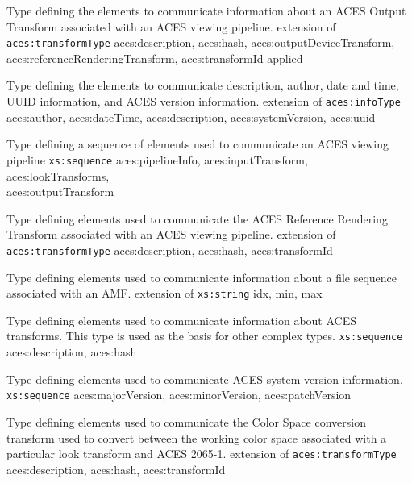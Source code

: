                 {Type defining the elements to communicate information about an ACES Output Transform associated with an ACES viewing pipeline.}
                {extension of \texttt{aces:transformType}}
                {aces:description, aces:hash, aces:outputDeviceTransform,\\ aces:referenceRenderingTransform, aces:transformId}
                {applied}

            {Type defining the elements to communicate description, author, date and time, UUID information, and ACES version information.}
            {extension of \texttt{aces:infoType}}
            {aces:author, aces:dateTime, aces:description, aces:systemVersion, aces:uuid}
            
            {Type defining a sequence of elements used to communicate an ACES viewing pipeline}
            {\texttt{xs:sequence}}
            {aces:pipelineInfo, aces:inputTransform, aces:lookTransforms,\\ aces:outputTransform}
 
            {Type defining elements used to communicate the ACES Reference Rendering Transform associated with an ACES viewing pipeline.}
            {extension of \texttt{aces:transformType}}
            {aces:description, aces:hash, aces:transformId}

                {Type defining elements used to communicate information about a file sequence associated with an AMF.}
                {extension of \texttt{xs:string}}
                {idx, min, max}

            {Type defining elements used to communicate information about ACES transforms.  This type is used as the basis for other complex types.}
            {\texttt{xs:sequence}}
            {aces:description, aces:hash}

            {Type defining elements used to communicate ACES system version information.}
            {\texttt{xs:sequence}}
            {aces:majorVersion, aces:minorVersion, aces:patchVersion}

            {Type defining elements used to communicate the Color Space conversion transform used to convert between the working color space associated with a particular look transform and ACES 2065-1.}
            {extension of \texttt{aces:transformType}}
            {aces:description, aces:hash, aces:transformId}
